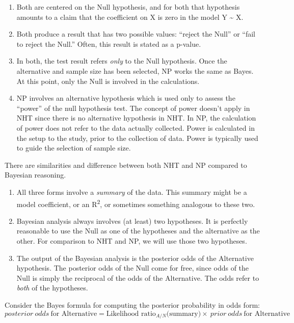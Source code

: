 \documentclass[
  letterpaper,
  DIV=11,
  numbers=noendperiod,
  oneside]{scrartcl}
\begin{document}
\begin{enumerate}
\def\labelenumi{\roman{enumi}.}
\item
  Both are centered on the Null hypothesis, and for both that hypothesis
  amounts to a claim that the coefficient on X is zero in the model Y
  \textasciitilde{} X.
\item
  Both produce a result that has two possible values: ``reject the
  Null'' or ``fail to reject the Null.'' Often, this result is stated as
  a p-value.
\item
  In both, the test result refers \emph{only} to the Null hypothesis.
  Once the alternative and sample size has been selected, NP works the
  same as Bayes. At this point, only the Null is involved in the
  calculations.
\item
  NP involves an alternative hypothesis which is used only to assess the
  ``power'' of the null hypothesis test. The concept of power doesn't
  apply in NHT since there is no alternative hypothesis in NHT. In NP,
  the calculation of power does not refer to the data actually
  collected. Power is calculated in the setup to the study, prior to the
  collection of data. Power is typically used to guide the selection of
  sample size.
\end{enumerate}

There are similarities and difference between both NHT and NP compared
to Bayesian reasoning.

\begin{enumerate}
\def\labelenumi{\roman{enumi}.}
\item
  All three forms involve a \emph{summary} of the data. This summary
  might be a model coefficient, or an R\textsuperscript{2}, or sometimes
  something analogous to these two.
\item
  Bayesian analysis always involves (at least) two hypotheses. It is
  perfectly reasonable to use the Null as one of the hypotheses and the
  alternative as the other. For comparison to NHT and NP, we will use
  those two hypotheses.
\item
  The output of the Bayesian analysis is the posterior odds of the
  Alternative hypothesis. The posterior odds of the Null come for free,
  since odds of the Null is simply the reciprocal of the odds of the
  Alternative. The odds refer to \emph{both} of the hypotheses.
\end{enumerate}

Consider the Bayes formula for computing the posterior probability in
odds form:
\[posterior\ odds\ \text{for Alternative} = \text{Likelihood ratio}_{A/N}\text{(summary)} \times \ prior\ odds\ \text{for Alternative}\]
\end{document}
